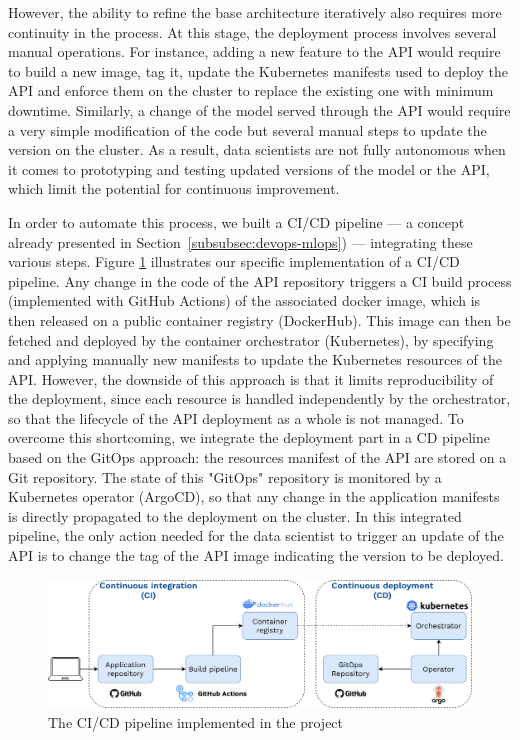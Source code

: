 However, the ability to refine the base architecture iteratively also requires more continuity in the process. At this stage, the deployment process involves several manual operations. For instance, adding a new feature to the API would require to build a new image, tag it, update the Kubernetes manifests used to deploy the API and enforce them on the cluster to replace the existing one with minimum downtime. Similarly, a change of the model served through the API would require a very simple modification of the code but several manual steps to update the version on the cluster. As a result, data scientists are not fully autonomous when it comes to prototyping and testing updated versions of the model or the API, which limit the potential for continuous improvement.

In order to automate this process, we built a CI/CD pipeline — a concept already presented in Section~\ref{subsubsec:devops-mlops}) — integrating these various steps. Figure \ref{fig:ci-cd} illustrates our specific implementation of a CI/CD pipeline. Any change in the code of the API repository triggers a CI build process (implemented with GitHub Actions) of the associated docker image, which is then released on a public container registry (DockerHub). This image can then be fetched and deployed by the container orchestrator (Kubernetes), by specifying and applying manually new manifests to update the Kubernetes resources of the API. However, the downside of this approach is that it limits reproducibility of the deployment, since each resource is handled independently by the orchestrator, so that the lifecycle of the API deployment as a whole is not managed. To overcome this shortcoming, we integrate the deployment part in a CD pipeline based on the GitOps approach: the resources manifest of the API are stored on a Git repository. The state of this "GitOps" repository is monitored by a Kubernetes operator (ArgoCD), so that any change in the application manifests is directly propagated to the deployment on the cluster. In this integrated pipeline, the only action needed for the data scientist to trigger an update of the API is to change the tag of the API image indicating the version to be deployed.

\begin{figure}[htbp]
    \centering
    \includegraphics[width=\textwidth]{sections/img/ci-cd.png}
    \caption{The CI/CD pipeline implemented in the project}
    \label{fig:ci-cd}
\end{figure}

